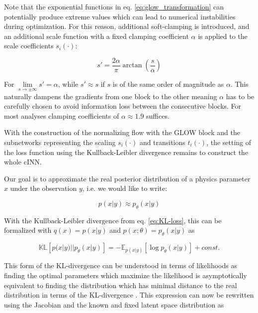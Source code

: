 Note that the exponential functions in eq. \ref{eq:glow_transformation} can potentially produce extreme values which can lead to numerical instabilities during optimization. For this reason, additional soft-clamping is introduced, and an additional scale function with a fixed clamping coefficient $\alpha$ is applied to the scale coefficients $s_i(\cdot)$:

\begin{equation*}
	s' = \frac{2\alpha}{\pi} \arctan\left(\frac{s}{\alpha}\right)
\end{equation*}

For $\lim\limits_{s\rightarrow\pm\infty} s' = \alpha$, while $s' \approx s$ if $s$ is of the same order of magnitude as $\alpha$. This naturally dampens the gradients from one block to the other meaning $\alpha$ has to be carefully chosen to avoid information loss between the consecutive blocks. For most analyses clamping coefficients of $\alpha \approx 1.9$ suffices.

With the construction of the normalizing flow with the GLOW block and the subnetworks representing the scaling $s_i(\cdot)$ and transitions $t_i(\cdot)$, the setting of the loss function using the Kullback-Leibler divergence remains to construct the whole cINN.


Our goal is to approximate the real posterior distribution of a physics parameter $x$ under the observation $y$, i.e. we would like to write:

\begin{equation*}
	p(x | y) \approx p_\theta(x | y)
\end{equation*}

With the Kullback-Leibler divergence from eq. \ref{eq:KL-loss}, this can be formalized with $q(x) = p(x | y)$ and $p(x; \theta) = p_\theta(x | y)$ as

\begin{equation*}
	\mathbb{KL}\left[p(x | y) || p_\theta(x | y) \right] = - \mathbb{E}_{p(x | y)} \left[ \log p_\theta(x | y)\right] + const.
\end{equation*}

This form of the KL-divergence can be understood in terms of likelihoods as finding the optimal parameters which maximize the likelihood is asymptotically equivalent to finding the distribution which has minimal distance to the real distribution in terms of the KL-divergence \cite{Bishop_book}. This expression can now be rewritten using the Jacobian and the known and fixed latent space distribution as

